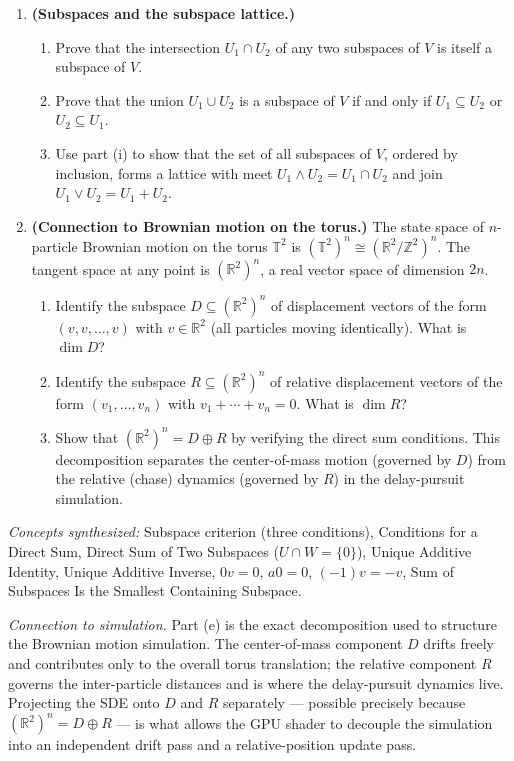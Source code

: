 \begin{remark*}
\begin{enumerate}[label=(\alph*)]
\item \textbf{(Subspaces and the subspace lattice.)}
\begin{enumerate}[label=(\roman*)]
  \item Prove that the intersection $U_1 \cap U_2$ of any two subspaces of $V$
        is itself a subspace of $V$.
  \item Prove that the union $U_1 \cup U_2$ is a subspace of $V$ if and only if
        $U_1 \subseteq U_2$ or $U_2 \subseteq U_1$.
  \item Use part (i) to show that the set of all subspaces of $V$, ordered by
        inclusion, forms a lattice with meet $U_1 \wedge U_2 = U_1 \cap U_2$
        and join $U_1 \vee U_2 = U_1 + U_2$.
\end{enumerate}

\item \textbf{(Connection to Brownian motion on the torus.)}
The state space of $n$-particle Brownian motion on the torus $\mathbb{T}^2$
is $(\mathbb{T}^2)^n \cong (\mathbb{R}^2/\mathbb{Z}^2)^n$. The tangent
space at any point is $(\mathbb{R}^2)^n$, a real vector space of dimension $2n$.
\begin{enumerate}[label=(\roman*)]
  \item Identify the subspace $D \subseteq (\mathbb{R}^2)^n$ of displacement
        vectors of the form $(v, v, \ldots, v)$ with $v \in \mathbb{R}^2$
        (all particles moving identically). What is $\dim D$?
  \item Identify the subspace $R \subseteq (\mathbb{R}^2)^n$ of relative
        displacement vectors of the form $(v_1, \ldots, v_n)$ with
        $v_1 + \cdots + v_n = 0$. What is $\dim R$?
  \item Show that $(\mathbb{R}^2)^n = D \oplus R$ by verifying the direct sum
        conditions. This decomposition separates the center-of-mass motion
        (governed by $D$) from the relative (chase) dynamics (governed by $R$)
        in the delay-pursuit simulation.
\end{enumerate}

\end{enumerate}

\medskip
\textit{Concepts synthesized:}
Subspace criterion (three conditions),
Conditions for a Direct Sum,
Direct Sum of Two Subspaces ($U \cap W = \{0\}$),
Unique Additive Identity,
Unique Additive Inverse,
$0v = 0$, $a0 = 0$, $(-1)v = -v$,
Sum of Subspaces Is the Smallest Containing Subspace.

\medskip
\textit{Connection to simulation.}
Part (e) is the exact decomposition used to structure the Brownian motion
simulation. The center-of-mass component $D$ drifts freely and contributes
only to the overall torus translation; the relative component $R$ governs
the inter-particle distances and is where the delay-pursuit dynamics live.
Projecting the SDE onto $D$ and $R$ separately --- possible precisely because
$(\mathbb{R}^2)^n = D \oplus R$ --- is what allows the GPU shader to decouple
the simulation into an independent drift pass and a relative-position update
pass.
\end{remark*}

